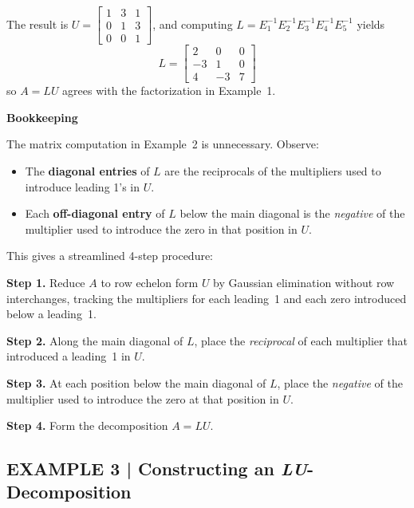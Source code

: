 \documentclass{article}
\newcommand{\redheading}[1]{{\vspace{2mm}\noindent\Large\bfseries\color{red!55!black} #1\par}\vspace{2mm}}
\begin{document}
The result is $U = \begin{bmatrix}1&3&1\\0&1&3\\0&0&1\end{bmatrix}$, and computing
$L = E_1^{-1}E_2^{-1}E_3^{-1}E_4^{-1}E_5^{-1}$ yields
\[
  L = \begin{bmatrix}2&0&0\\-3&1&0\\4&-3&7\end{bmatrix} \tag{11}
\]
so $A = LU$ agrees with the factorization in Example~1.

\vspace{2mm}
\redheading{Bookkeeping}

The matrix computation in Example~2 is unnecessary. Observe:
\begin{itemize}
  \item The \textbf{diagonal entries} of $L$ are the reciprocals of the multipliers used
        to introduce leading 1's in $U$.
  \item Each \textbf{off-diagonal entry} of $L$ below the main diagonal is the
        \emph{negative} of the multiplier used to introduce the zero in that position in $U$.
\end{itemize}
This gives a streamlined 4-step procedure:

\begin{tcolorbox}[colback=blue!4, colframe=blue!55!black,
  title={\textbf{Procedure for Constructing an \textit{LU}-Decomposition}},
  boxrule=0.5mm, arc=3mm]
\textbf{Step 1.} Reduce $A$ to row echelon form $U$ by Gaussian elimination without row
interchanges, tracking the multipliers for each leading~1 and each zero introduced below
a leading~1.

\textbf{Step 2.} Along the main diagonal of $L$, place the \emph{reciprocal} of each
multiplier that introduced a leading~1 in $U$.

\textbf{Step 3.} At each position below the main diagonal of $L$, place the
\emph{negative} of the multiplier used to introduce the zero at that position in $U$.

\textbf{Step 4.} Form the decomposition $A = LU$.
\end{tcolorbox}

\subsection*{EXAMPLE 3 | Constructing an \textit{LU}-Decomposition}
\end{document}
